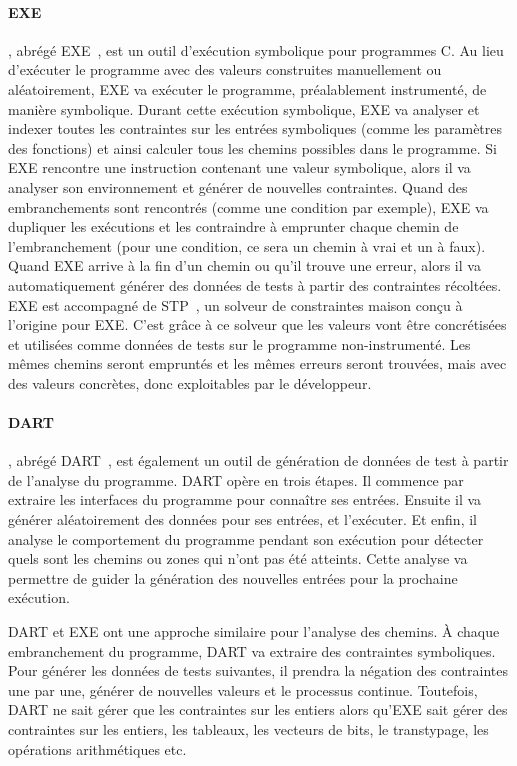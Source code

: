 \paragraph{EXE} , abrégé
EXE~, est un outil d'exécution symbolique pour
programmes C.  Au lieu d'exécuter le programme avec des valeurs construites
manuellement ou aléatoirement, EXE va exécuter le programme, préalablement
instrumenté, de manière symbolique. Durant cette exécution symbolique, EXE va
analyser et indexer toutes les contraintes sur les entrées symboliques (comme
les paramètres des fonctions) et ainsi calculer tous les chemins possibles dans
le programme.  Si EXE rencontre une instruction contenant une valeur symbolique,
alors il va analyser son environnement et générer de nouvelles contraintes.
Quand des embranchements sont rencontrés (comme une condition par exemple), EXE
va dupliquer les exécutions et les contraindre à emprunter chaque chemin de
l'embranchement (pour une condition, ce sera un chemin à vrai et un à faux).
Quand EXE arrive à la fin d'un chemin ou qu'il trouve une erreur, alors il va
automatiquement générer des données de tests à partir des contraintes récoltées.
EXE est accompagné de STP~, un solveur de constraintes maison
conçu à l'origine pour EXE. C'est grâce à ce solveur que les valeurs vont être
concrétisées et utilisées comme données de tests sur le programme
non-instrumenté. Les mêmes chemins seront empruntés et les mêmes erreurs seront
trouvées, mais avec des valeurs concrètes, donc exploitables par le développeur.

\paragraph{DART} , abrégé
DART~, est également un outil de génération de données de
test à partir de l'analyse du programme. DART opère en trois étapes. Il commence
par extraire les interfaces du programme pour connaître ses entrées. Ensuite il
va générer aléatoirement des données pour ses entrées, et l'exécuter. Et enfin,
il analyse le comportement du programme pendant son exécution pour détecter
quels sont les chemins ou zones qui n'ont pas été atteints. Cette analyse va
permettre de guider la génération des nouvelles entrées pour la prochaine
exécution.

DART et EXE ont une approche similaire pour l'analyse des chemins. À chaque
embranchement du programme, DART va extraire des contraintes symboliques. Pour
générer les données de tests suivantes, il prendra la négation des contraintes
une par une, générer de nouvelles valeurs et le processus continue. Toutefois,
DART ne sait gérer que les contraintes sur les entiers alors qu'EXE sait gérer
des contraintes sur les entiers, les tableaux, les vecteurs de bits, le
transtypage, les opérations arithmétiques etc.

